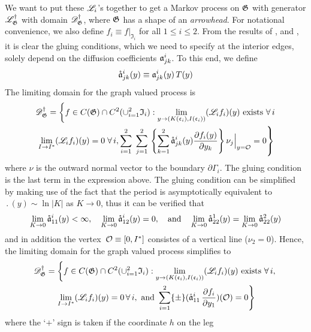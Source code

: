 We want to put these $\mathscr L_i$'s together to get a Markov process on $\mathfrak G$ with generator $\mathscr L^\dagger_\mathfrak G$ with domain $\mathscr{D}^\dagger_\mathfrak G$, where $\mathfrak G$ has a shape of an \emph{arrowhead}. For notational convenience, we also define $f_i \equiv f\big|_{\mathfrak{I}_i}$ for all $1\le i\le 2$. From the results of \citet{freidlin98:_random_pertur_nonlin_oscil}, and \citet{sowers03:_stoch_averag_near_homoc_orbit}, it is clear the gluing conditions, which we need to specify at the interior edges, solely depend on the diffusion coefficients $\mathfrak a_{jk}^{i}$. To this end, we define
\[
\mathring{\mathfrak a}_{jk}^{i}(y)\equiv \mathfrak a_{jk}^{i}(y) \, T(y)
\]
The limiting domain for the graph valued process is
\begin{multline}
\mathscr{D}_\mathfrak G^\dagger = \left\{f \in C(\mathfrak G) \cap C^2(\cup_{i=1}^2 \mathfrak I_i): \lim_{y \to (K(\mathfrak c_i),I(\mathfrak c_i))}(\mathscr L_i f_i)(y) \text{ exists } \forall \, i\right.\\
\left.\lim_{I \to I^*} (\mathscr L_i f_i)(y) = 0\; \forall\, i, \sum_{i=1}^2 \; \sum_{j=1}^2\,\left\{ \sum_{k=1}^2 \mathring{\mathfrak a}_{jk}^{i}(y) \frac{\partial f_i(y)}{\partial y_k}\right\} \nu_j \Big|_{y = \mathcal{O}} = 0\right\}
\label{E:dom-graph}
\end{multline}
where $\nu$ is the outward normal vector to the boundary $\partial\Gamma_i$. The gluing condition is the last term in the expression above. The gluing condition can be simplified by making use of the fact that the period
is asymptotically equivalent to $\period(y) \sim \ln |K|$ as $K \to 0$, thus it can be verified that
\[
\lim_{K \to 0} \mathring{\mathfrak a}_{11}^{i}(y) < \infty, \quad \lim_{K \to 0} \mathring{\mathfrak a}_{12}^{i}(y)= 0, \quad \text{and} \quad \lim_{K \to 0} \mathring{\mathfrak a}_{22}^1(y) = \lim_{K \to 0} \mathring{\mathfrak a}_{22}^2(y)
\]
and in addition the vertex~$\mathcal{O} \equiv [0,I^*]$ consistes of a
vertical line ($\nu_2 = 0$). Hence, the limiting domain for the graph
valued process simplifies to
\begin{multline}
\mathscr{D}_\mathfrak G^\dagger = \left\{f\in C(\mathfrak G)\cap C^2(\cup_{i=1}^2\mathfrak{I}_i): \lim_{y \to \left(K(\mathfrak{c}_i),I(\mathfrak{c}_i)\right)}(\mathscr L_i f_i)(y) \text{ exists } \forall \, i, \right.\\
\left. \lim_{I \to I^*}(\mathscr L_i f_i)(y)=0 \, \forall \, i, \text{ and } \sum_{i=1}^2 \{\pm\} (\mathring{\mathfrak a}_{11}^{i}\,\frac{\partial f_i}{\partial y_1})(\mathcal{O}) = 0 \right\}
\label{E:dom-graph-simplified}
\end{multline}
where the `$+$' sign is taken if the coordinate $h$ on the leg
